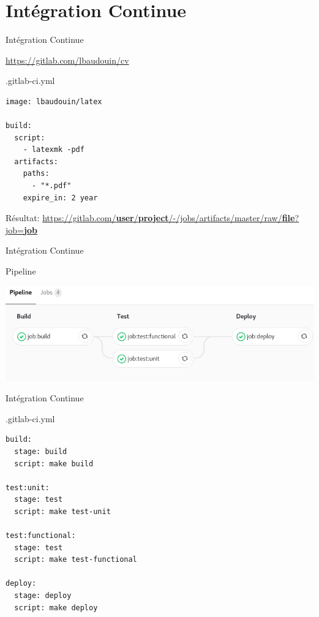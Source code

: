 \documentclass{beamer}
\begin{document}
\section{Intégration Continue}
\begin{frame}[fragile]{Intégration Continue}

\url{https://gitlab.com/lbaudouin/cv}

\begin{block}{.gitlab-ci.yml}
\begin{verbatim}
image: lbaudouin/latex

build:
  script:
    - latexmk -pdf
  artifacts:
    paths:
      - "*.pdf"
    expire_in: 2 year
\end{verbatim}
\end{block}

Résultat:
\footnotesize
\href{https://gitlab.com/lbaudouin/cv/-/jobs/artifacts/master/raw/cv-lbaudouin.pdf?job=build}{https://gitlab.com/\textbf{user}/\textbf{project}/-/jobs/artifacts/master/raw/\textbf{file}?job=\textbf{job}}



\end{frame}



\begin{frame}[fragile]{Intégration Continue}
\begin{block}{Pipeline}
\begin{center}
\includegraphics[width=1.0\linewidth]{images/ci-stages}
\end{center}
\end{block}
\end{frame}




\begin{frame}[fragile]{Intégration Continue}

\begin{block}{.gitlab-ci.yml}
\scriptsize
\begin{verbatim}
build:
  stage: build
  script: make build

test:unit:
  stage: test
  script: make test-unit

test:functional:
  stage: test
  script: make test-functional

deploy:
  stage: deploy
  script: make deploy
\end{verbatim}
\end{block}
\end{frame}
\end{document}
